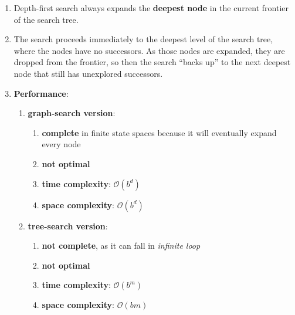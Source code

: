 \begin{enumerate}
    \item Depth-first search always expands the \textbf{deepest node} in the current frontier of the search tree.
    \hfill \cite{ai/book/Artificial-Intelligence-A-Modern-Approach/Russell-Norvig}

    \item The search proceeds immediately to the deepest level of the search tree, where the nodes have no successors. As those nodes are expanded, they are dropped from the frontier, so then the search “backs up” to the next deepest node that still has unexplored successors.
    \hfill \cite{ai/book/Artificial-Intelligence-A-Modern-Approach/Russell-Norvig}

    \item \textbf{Performance}:
    \begin{enumerate}
        \item \textbf{graph-search version}:
        \begin{enumerate}
            \item \textbf{complete} in finite state spaces because it will eventually expand every node
            \hfill \cite{ai/book/Artificial-Intelligence-A-Modern-Approach/Russell-Norvig}

            \item \textbf{not optimal}
            \hfill \cite{ai/book/Artificial-Intelligence-A-Modern-Approach/Russell-Norvig}

            \item \textbf{time complexity}: $\mathcal{O}(b^d)$
            \hfill \cite{ai/book/Artificial-Intelligence-A-Modern-Approach/Russell-Norvig}

            \item \textbf{space complexity}: $\mathcal{O}(b^d)$
            \hfill \cite{ai/book/Artificial-Intelligence-A-Modern-Approach/Russell-Norvig}
        \end{enumerate}

        \item \textbf{tree-search version}:
        \begin{enumerate}
            \item \textbf{not complete}, as it can fall in \textit{infinite loop}
            \hfill \cite{ai/book/Artificial-Intelligence-A-Modern-Approach/Russell-Norvig}

            \item \textbf{not optimal}
            \hfill \cite{ai/book/Artificial-Intelligence-A-Modern-Approach/Russell-Norvig}

            \item \textbf{time complexity}: $\mathcal{O}(b^m)$
            \hfill \cite{ai/book/Artificial-Intelligence-A-Modern-Approach/Russell-Norvig}

            \item \textbf{space complexity}: $\mathcal{O}(bm)$
            \hfill \cite{ai/book/Artificial-Intelligence-A-Modern-Approach/Russell-Norvig}
        \end{enumerate}
    \end{enumerate}
\end{enumerate}


